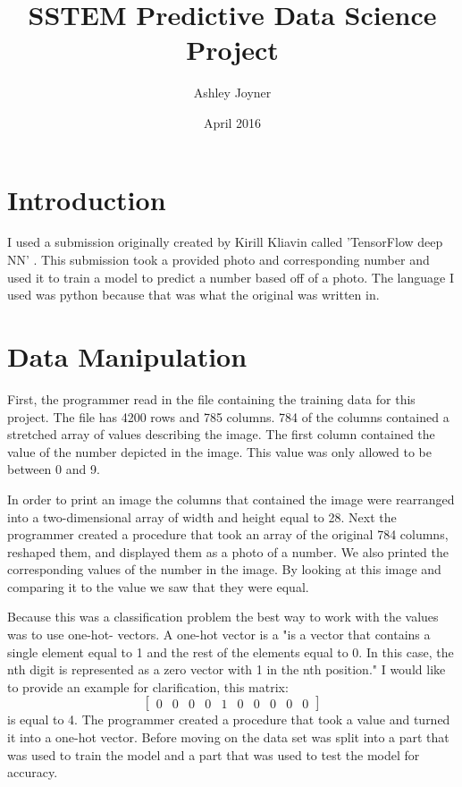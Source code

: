 \documentclass{article}
\title{SSTEM Predictive Data Science Project}
\author{Ashley Joyner }
\date{April 2016}
\begin{document}
\maketitle

\section{Introduction}

I used a submission originally created by Kirill Kliavin called 'TensorFlow deep NN' \cite{DigitRecognizer}. This submission took a provided photo and corresponding number and used it to train a model to predict a number based off of a photo. The language I used was python because that was what the original was written in.

\section{Data Manipulation}

First, the programmer read in the file containing the training data for this project. The file has 4200 rows and 785 columns. 784 of the columns contained a stretched array of values describing the image. The first column contained the value of the number depicted in the image. This value was only allowed to be between 0 and 9.

In order to print an image the columns that contained the image were rearranged into a two-dimensional array of width and height equal to 28. Next the programmer created a procedure that took an array of the original 784 columns, reshaped them, and displayed them as a photo of a number. We also printed the corresponding values of the number in the image. By looking at this image and comparing it to the value we saw that they were equal. 

Because this was a classification problem the best way to work with the values was to use one-hot- vectors. A one-hot vector is a "is a vector that contains a single element equal to 1 and the rest of the elements equal to 0. In this case, the nth digit is represented as a zero vector with 1 in the nth position." \cite{DigitRecognizer} I would like to provide an example for clarification, this matrix:
$$\begin{bmatrix} 
0 & 0 & 0 & 0 & 1 & 0 & 0 & 0 & 0 & 0
\end{bmatrix}$$
is equal to 4. The programmer created a procedure that took a value and turned it into a one-hot vector. Before moving on the data set was split into a part that was used to train the model and a part that was used to test the model for accuracy.  
\end{document}
